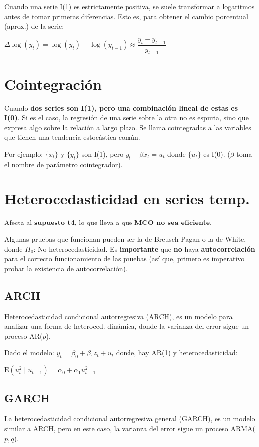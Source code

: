 \documentclass[10pt, a4paper, landscape]{article}
\newcommand{\E}{\mathrm{E}}
\begin{document}
\begin{multicols}{3}
		Cuando una serie I(1) es estrictamente positiva, se suele transformar a logaritmos antes de tomar primeras diferencias. Esto es, para obtener el cambio porcentual (aprox.) de la serie:
		
		\begin{center}
			$\Delta \log(y_{t}) = \log(y_{t}) - \log(y_{t - 1}) \approx \dfrac{y_t - y_{t - 1}} {y_{t - 1}}$
		\end{center}
		
		\section*{Cointegración}
		
		Cuando \textbf{dos series son I(1), pero una combinación lineal de estas es I(0)}. Si es el caso, la regresión de una serie sobre la otra no es espuria, sino que expresa algo sobre la relación a largo plazo. Se llama cointegradas a las variables que tienen una tendencia estocástica común.
		
		Por ejemplo: $\lbrace x_{t} \rbrace$ y $\lbrace y_{t} \rbrace$ son I(1), pero $y_{t} - \beta x_{t} = u_{t}$ donde $\lbrace u_{t} \rbrace$ es I(0). ($\beta$ toma el nombre de parámetro cointegrador).
		
		\section*{Heterocedasticidad en series temp.}
		
		Afecta al \textbf{supuesto t4}, lo que lleva a que \textbf{MCO no sea eficiente}.
		
		Algunas pruebas que funcionan pueden ser la de Breusch-Pagan o la de White, donde $H_{0}$: No heterocedasticidad. Es \textbf{importante} que \textbf{no} haya \textbf{autocorrelación} para el correcto funcionamiento de las pruebas (así que, primero es imperativo probar la existencia de autocorrelación).
		
		\subsection*{ARCH}
		
		Heterocedasticidad condicional autorregresiva (ARCH), es un modelo para analizar una forma de heteroced. dinámica, donde la varianza del error sigue un proceso AR($p$).
		
		Dado el modelo: $y_{t} = \beta_{0} + \beta_{1} z_{t} + u_{t}$ donde, hay AR(1) y heterocedasticidad:
		
		\begin{center}
			$\E(u^{2}_{t} \mid u_{t - 1}) = \alpha_{0} + \alpha_{1} u^{2}_{t - 1}$
		\end{center}
		
		\subsection*{GARCH}
		
		La heterocedasticidad condicional autorregresiva general (GARCH), es un modelo similar a ARCH, pero en este caso, la varianza del error sigue un proceso ARMA($p, q$).
	\end{multicols}
\end{document}
